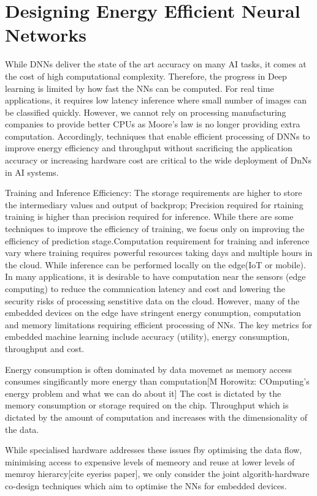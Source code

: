 \section{Designing Energy Efficient Neural Networks}\label{algoback}

While DNNs deliver the state of the art accuracy on many AI tasks, it comes at the cost of high computational complexity.
Therefore, the progress in Deep learning is limited by how fast the NNs can be computed.
For real time applications, it requires low latency inference where small number of images can be classified quickly.
However, we cannot rely on processing manufacturing companies to provide better CPUs as Moore's law is no longer providing extra computation.
Accordingly, techniques that enable efficient processing of DNNs to improve energy efficiency and throughput without sacrificing the application accuracy or increasing hardware cost are critical to the wide deployment of DnNs in AI systems.




Training and Inference Efficiency:
The storage requirements are higher to store the intermediary values and output of backprop; Precision required for rtaining training is higher than precision required for inference.
While there are some techniques to improve the efficiency of training, we focus only on improving the efficiency of prediction stage.Computation requirement for training and inference vary where training requires powerful resources taking days and multiple hours in the cloud.
While inference can be performed locally on the edge(IoT or mobile).
In many applications, it is desirable to have computation near the sensors (edge computing) to reduce the commnication latency and cost and lowering the security risks of processing senstitive data on the cloud.
However, many of the embedded devices on the edge have stringent energy conumption, computation and memory limitations requiring efficient processing of NNs.
The key metrics for embedded machine learning include accuracy (utility), energy consumption, throughput and cost.

Energy consumption is often dominated by data movemet as memory access consumes singificantly more energy than computation[M Horowitz: COmputing's energy problem and what we can do about it]
The cost is dictated by the memory consumption or storage required on the chip.
Throughput which is dictated by the amount of computation and increases with the dimensionality of the data.

While specialised hardware addresses these issues fby optimising the data flow, minimising access to expensive levels of memeory and reuse at lower levels of memroy hierarcy[cite eyeriss paper], we only consider the joint algorith-hardware co-design techniques which aim to optimise the NNs for embedded devices.

